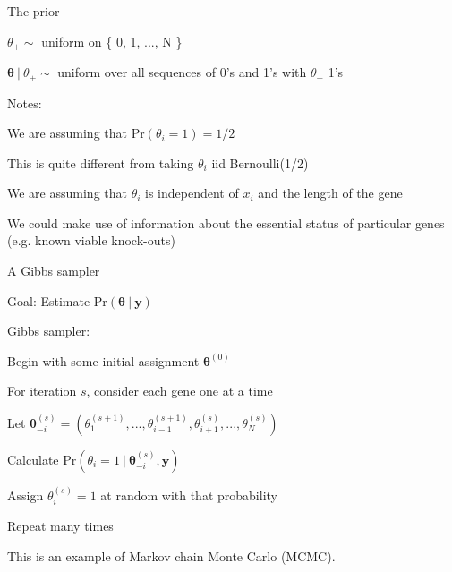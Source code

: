 \documentclass[aspectratio=169,12pt,t]{beamer}
\begin{document}
\begin{frame}{The prior}

  \bigskip

  $\theta_+ \sim$ uniform on \{ 0, 1, ..., N \}

  \bigskip

$\boldsymbol{\theta} \ | \ \theta_+ \sim$  uniform over all sequences of 0's and 1's with $\theta_+$ 1's


  \bigskip \bigskip

  {\color{title} Notes:}
  \bi
\item We are assuming that $\text{Pr}(\theta_i = 1) = 1/2$
\item This is quite different from taking $\theta_i$ iid
  Bernoulli(1/2)
\item We are assuming that $\theta_i$ is independent of $x_i$ and the
  length of the gene
\item We could make use of information about the essential status of
  particular genes (e.g. known viable knock-outs)
  \ei


\note{
}

\end{frame}



\begin{frame}{A Gibbs sampler}

\bigskip

  {\color{title} Goal}: Estimate $\text{Pr}(\boldsymbol{\theta} \ | \ \boldsymbol{y})$

\bigskip

{\color{title} Gibbs sampler:}
\bi
\item Begin with some initial assignment $\boldsymbol{\theta}^{(0)}$
\item For iteration $s$, consider each gene one at a time
 \bi
  \item Let $\boldsymbol{\theta}_{-i}^{(s)} = (\theta_1^{(s+1)}, ..., \theta_{i-1}^{(s+1)}, \theta_{i+1}^{(s)}, ..., \theta_N^{(s)})$
  \item Calculate $\text{Pr}(\theta_i = 1 \ | \ \boldsymbol{\theta}_{-i}^{(s)}, \boldsymbol{y})$
  \item Assign $\theta_i^{(s)} = 1$ at random with that probability
 \ei
\item Repeat many times
  \ei

\bigskip \bigskip

This is an example of {\vhilit Markov chain Monte Carlo (MCMC)}.

  \note{
  }
\end{frame}
\end{document}
